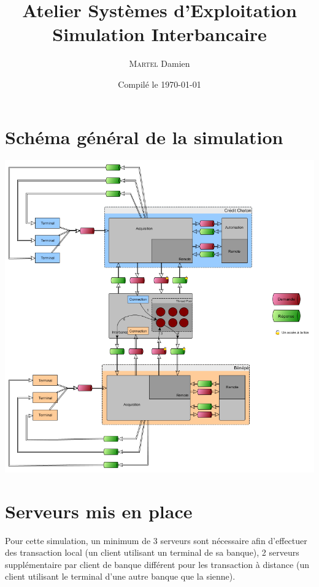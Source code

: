 \documentclass[french, a4paper, 12pt, titlepage]{article}
\begin{document}
\title{Atelier Systèmes d'Exploitation\\Simulation Interbancaire}
\author{\textsc{Martel} Damien}
\date{Compilé le \today}

\maketitle

\vfill
\pagebreak

\newpage
\strut\thispagestyle{empty}
\vfill
\pagebreak
\tableofcontents
\strut\thispagestyle{empty}
\newpage
\setcounter{page}{1}

\section{Schéma général de la simulation}
\medskip
\begin{center}
\includegraphics[scale=0.5]{global}
\end{center}
\medskip
\section{Serveurs mis en place}
Pour cette simulation, un minimum de 3 serveurs sont nécessaire afin d'effectuer des transaction local
(un client utilisant un terminal de sa banque),
2 serveurs supplémentaire par client de banque différent pour les transaction à distance (un client utilisant le terminal d'une autre banque que la sienne).
\end{document}
